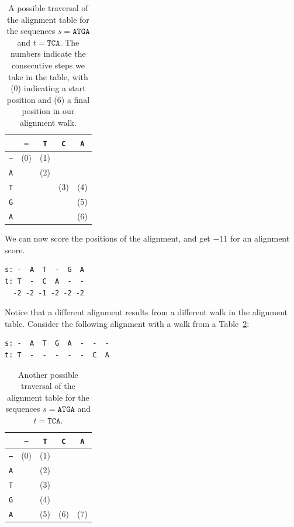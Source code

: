 \begin{table}[h!]
\centering
\caption{A possible traversal of the alignment table for the sequences $s=\texttt{ATGA}$ and $t=\texttt{TCA}$. The numbers indicate the consecutive steps we take in the table, with (0) indicating a start position and (6) a final position in our alignment walk.}
\label{t:align-table-1}
\begin{tabular}{c|cccc}
\hline
 & \texttt{–} & \texttt{T} & \texttt{C} & \texttt{A} \\
\hline
\texttt{–} & (0) & (1) &  &  \\
\texttt{A} &  & (2) &  &  \\
\texttt{T} &  &  & (3) &  (4) \\
\texttt{G} &  &  &  & (5) \\
\texttt{A} &  &  &  &  (6) \\
\hline
\end{tabular}
\end{table}

We can now score the positions of the alignment, and get $-11$ for an alignment score.

\begin{verbatim}
s: -  A  T  -  G  A
t: T  -  C  A  -  -
  -2 -2 -1 -2 -2 -2
\end{verbatim}

Notice that a different alignment results from a different walk in the alignment table. Consider the following alignment with a walk from a Table~\ref{t:align-table-2}:

\begin{verbatim}
s: -  A  T  G  A  -  -  -
t: T  -  -  -  -  -  C  A
\end{verbatim}

\begin{table}[h!]
\centering
\caption{Another possible traversal of the alignment table for the sequences $s=\texttt{ATGA}$ and $t=\texttt{TCA}$.}
\label{t:align-table-2}
\begin{tabular}{c|cccc}
\hline
 & \texttt{–} & \texttt{T} & \texttt{C} & \texttt{A} \\
\hline
\texttt{–} & (0) & (1) &     &  \\
\texttt{A} &     & (2) &     &  \\
\texttt{T} &     & (3) &     &  \\
\texttt{G} &     & (4) &     &  \\
\texttt{A} &     & (5) & (6) & (7) \\
\hline
\end{tabular}
\end{table}

